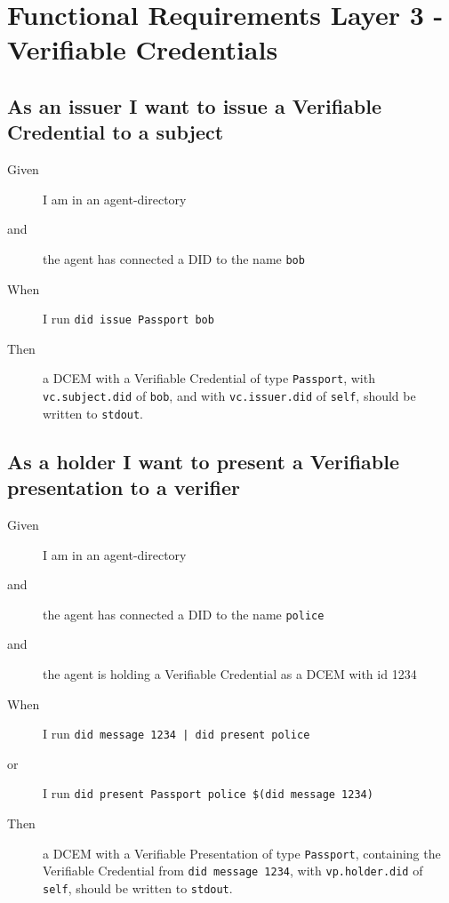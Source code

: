\newpage



\section{Functional Requirements Layer 3 - Verifiable Credentials}



\subsection{As an issuer I want to issue a Verifiable Credential to a subject}
\begin{description}\begin{description}
    \item[Given] I am in an agent-directory
    \item[and] the agent has connected a DID to the name \texttt{bob}
    \item[When] I run \texttt{did issue Passport bob}
    \item[Then] a DCEM with a Verifiable Credential of type \texttt{Passport}, with \texttt{vc.subject.did} of \texttt{bob}, and with \texttt{vc.issuer.did} of \texttt{self}, should be written to \texttt{stdout}.
\end{description}\end{description}



\subsection{As a holder I want to present a Verifiable presentation to a verifier}
\begin{description}\begin{description}
    \item[Given] I am in an agent-directory
    \item[and] the agent has connected a DID to the name \texttt{police}
    \item[and] the agent is holding a Verifiable Credential as a DCEM with id 1234
    \item[When] I run \texttt{did message 1234 | did present police}
    \item[or] I run \texttt{did present Passport police \$(did message 1234)}
    \item[Then] a DCEM with a Verifiable Presentation of type \texttt{Passport}, containing the Verifiable Credential from \texttt{did message 1234}, with \texttt{vp.holder.did} of \texttt{self}, should be written to \texttt{stdout}.
\end{description}\end{description}



